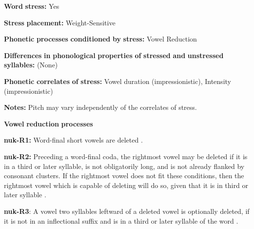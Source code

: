 \begin{styleBody}
\textbf{Word} \textbf{stress:} Yes
\end{styleBody}

\begin{styleBody}
\textbf{Stress} \textbf{placement:} Weight-Sensitive
\end{styleBody}

\begin{styleBody}
\textbf{Phonetic} \textbf{processes} \textbf{conditioned} \textbf{by} \textbf{stress:} Vowel Reduction
\end{styleBody}

\begin{styleBody}
\textbf{Differences} \textbf{in} \textbf{phonological} \textbf{properties} \textbf{of} \textbf{stressed} \textbf{and} \textbf{unstressed} \textbf{syllables:} (None)
\end{styleBody}

\begin{styleBody}
\textbf{Phonetic} \textbf{correlates} \textbf{of} \textbf{stress:} Vowel duration (impressionistic), Intensity (impressionistic)
\end{styleBody}

\begin{styleBody}
\textbf{Notes:} Pitch may vary independently of the correlates of stress.
\end{styleBody}

\begin{styleBody}
\textbf{Vowel} \textbf{reduction} \textbf{processes}
\end{styleBody}

\begin{styleBody}
\textbf{nuk-R1:} Word-final short vowels are deleted \citep[25]{Rose1981}.
\end{styleBody}

\begin{styleBody}
\textbf{nuk-R2:} Preceding a word-final coda, the rightmost vowel may be deleted if it is in a third or later syllable, is not obligatorily long, and is not already flanked by consonant clusters. If the rightmost vowel does not fit these conditions, then the rightmost vowel which is capable of deleting will do so, given that it is in third or later syllable \citep[25]{Rose1981}.
\end{styleBody}

\begin{styleBody}
\textbf{nuk-R3}: A vowel two syllables leftward of a deleted vowel is optionally deleted, if it is not in an inflectional suffix and is in a third or later syllable of the word \citep[25]{Rose1981}.
\end{styleBody}

